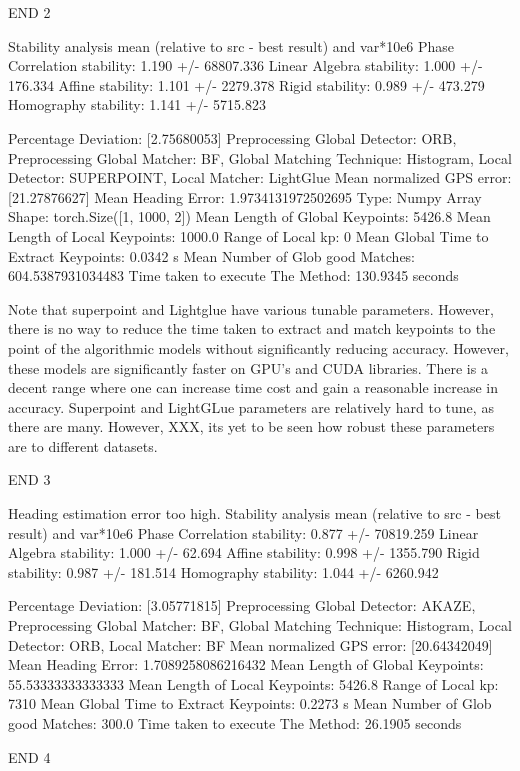 \begin{itemize}
END 2

Stability analysis mean (relative to src - best result) and var*10e6
Phase Correlation stability: 1.190 +/- 68807.336
Linear Algebra stability: 1.000 +/- 176.334
Affine stability: 1.101 +/- 2279.378
Rigid stability: 0.989 +/- 473.279
Homography stability: 1.141 +/- 5715.823

Percentage Deviation: [2.75680053] %
Preprocessing Global Detector: ORB, Preprocessing Global Matcher: BF, Global Matching Technique: Histogram, Local Detector: SUPERPOINT, Local Matcher: LightGlue
Mean normalized GPS error: [21.27876627]
 Mean Heading Error: 1.9734131972502695
Type: Numpy Array
Shape: torch.Size([1, 1000, 2])
Mean Length of Global Keypoints: 5426.8
Mean Length of Local Keypoints: 1000.0
Range of Local kp: 0
Mean Global Time to Extract Keypoints: 0.0342 s
Mean Number of Glob good Matches: 604.5387931034483
Time taken to execute The Method: 130.9345 seconds

Note that superpoint and Lightglue have various tunable parameters. However, there is no way to reduce the time taken to extract and match keypoints to the point of the algorithmic models without significantly reducing accuracy. However, these models are significantly faster on GPU's and CUDA libraries. There is a decent range where one can increase time cost and gain a reasonable increase in accuracy. Superpoint and LightGLue parameters are relatively hard to tune, as there are many. However, XXX, its yet to be seen how robust these parameters are to different datasets. 

END 3


Heading estimation error too high.
Stability analysis mean (relative to src - best result) and var*10e6
Phase Correlation stability: 0.877 +/- 70819.259
Linear Algebra stability: 1.000 +/- 62.694
Affine stability: 0.998 +/- 1355.790
Rigid stability: 0.987 +/- 181.514
Homography stability: 1.044 +/- 6260.942

Percentage Deviation: [3.05771815] %
Preprocessing Global Detector: AKAZE, Preprocessing Global Matcher: BF, Global Matching Technique: Histogram, Local Detector: ORB, Local Matcher: BF
Mean normalized GPS error: [20.64342049]
 Mean Heading Error: 1.7089258086216432
Mean Length of Global Keypoints: 55.53333333333333
Mean Length of Local Keypoints: 5426.8
Range of Local kp: 7310
Mean Global Time to Extract Keypoints: 0.2273 s
Mean Number of Glob good Matches: 300.0
Time taken to execute The Method: 26.1905 seconds


END 4



\end{itemize}
